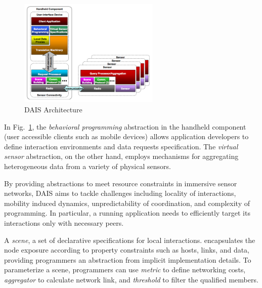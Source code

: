 \documentclass[11pt,onecolumn]{article}
\begin{document}
\begin{figure}
\vspace{-30pt}
  \begin{center}
    \includegraphics[width=0.6\textwidth]{resources/dais_architecture.png}
  \end{center}
  \vspace{-20pt}
  \caption{DAIS Architecture \cite{dais} \label{dais_architecture}}
    \vspace{-10pt}
\end{figure}

In Fig.~\ref{dais_architecture}, the {\em behavioral programming} abstraction in the handheld component (user accessible clients such as mobile devices) allows application developers to define interaction environments and data requests specification. The {\em virtual sensor} abstraction, on the other hand, employs mechanisms for aggregating heterogeneous data from a variety of physical sensors. 

By providing abstractions to meet resource constraints in immersive sensor networks, DAIS aims to tackle challenges including locality of interactions, mobility induced dynamics, unpredictability of coordination, and complexity of programming\cite{dais}. In particular, a running application needs to efficiently target its interactions only with necessary peers. 

A {\em scene}, a set of declarative specifications for local interactions. encapsulates the node exposure according to property constraints such as hosts, links, and data, providing programmers an abstraction from implicit implementation details. To parameterize a scene, programmers can use {\em metric} to define networking costs, {\em aggregator} to calculate network link, and {\em threshold} to filter the qualified members.
\end{document}
